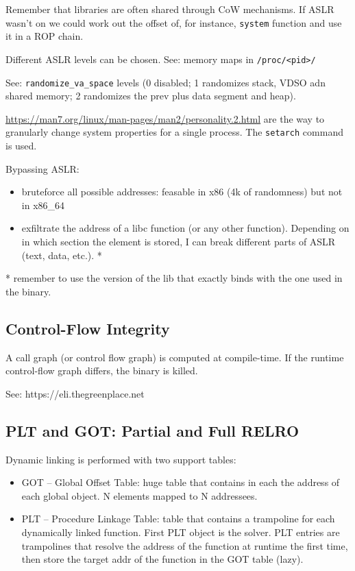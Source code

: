 Remember that libraries are often shared through CoW mechanisms.
If ASLR wasn't on we could work out the offset of, for instance, \texttt{system} function and use it in a ROP chain.

Different ASLR levels can be chosen. See: memory maps in \texttt{/proc/<pid>/}

See: \texttt{randomize_va_space} levels (0 disabled; 1 randomizes stack, VDSO adn shared memory; 2 randomizes the prev plus data segment and heap).

\href{Personalities}{https://man7.org/linux/man-pages/man2/personality.2.html} are the way to granularly change system properties for a single process. The \texttt{setarch} command is used.

Bypassing ASLR:
\begin{itemize}
  \item bruteforce all possible addresses: feasable in x86 (4k of randomness) but not in x86_64
  \item exfiltrate the address of a libc function (or any other function). Depending on in which section the element is stored, I can break different parts of ASLR (text, data, etc.). *
\end{itemize}

* remember to use the version of the lib that exactly binds with the one used in the binary.

\subsection{Control-Flow Integrity}
A call graph (or control flow graph) is computed at compile-time. If the runtime control-flow graph differs, the binary is killed.

See: https://eli.thegreenplace.net

\subsection{PLT and GOT: Partial and Full RELRO}
Dynamic linking is performed with two support tables:
\begin{itemize}
  \item GOT -- Global Offset Table: huge table that contains in each the address of each global object.
  N elements mapped to N addressees.
  \item PLT -- Procedure Linkage Table: table that contains a trampoline for each dynamically linked function.
  First PLT object is the solver.
  PLT entries are trampolines that resolve the address of the function at runtime the first time, then store the target addr of the function in the GOT table (lazy).
\end{itemize}

